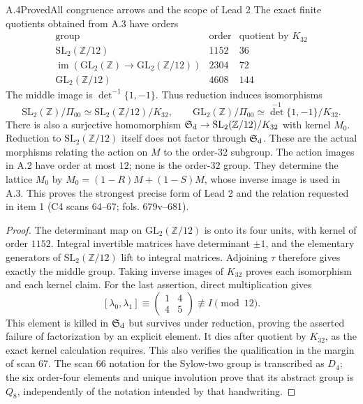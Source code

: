 \begin{statement}{A.4}{Proved}{All congruence arrows and the scope of Lead 2}
The exact finite quotients obtained from A.3 have orders
\[
\begin{array}{c|r|r}
\text{group}&\text{order}&\text{quotient by }K_{32}\\\hline
\mathrm{SL}_2(\mathbb Z/12)&1152&36\\
\operatorname{im}(\mathrm{GL}_2(\mathbb Z)\to\mathrm{GL}_2(\mathbb Z/12))&2304&72\\
\mathrm{GL}_2(\mathbb Z/12)&4608&144
\end{array}
\]
The middle image is $\det^{-1}\{1,-1\}$. Thus reduction induces
isomorphisms
\[
 \mathrm{SL}_2(\mathbb Z)/\Pi_{00}\simeq
 \mathrm{SL}_2(\mathbb Z/12)/K_{32},\qquad
 \mathrm{GL}_2(\mathbb Z)/\Pi_{00}\simeq
 \det^{-1}\{1,-1\}/K_{32}.
\]
There is also a surjective homomorphism
$\mathfrak S_{\rm d}\to\mathrm{SL}_2(\mathbb Z/12)/K_{32}$ with kernel
$M_0$. Reduction to $\mathrm{SL}_2(\mathbb Z/12)$ itself does not
factor through $\mathfrak S_{\rm d}$.
These are the actual morphisms relating the action on $M$ to the
order-$32$ subgroup. The action images in A.2 have order at most $12$;
none is the order-$32$ group. They determine the lattice $M_0$ by
$M_0=(1-R)M+(1-S)M$, whose inverse image is used in A.3.
This proves the strongest precise form of Lead 2 and the relation
requested in item 1 (C4 scans 64--67; fols. 679v--681).
\end{statement}
\begin{proof}
The determinant map on $\mathrm{GL}_2(\mathbb Z/12)$ is onto its four
units, with kernel of order $1152$. Integral invertible matrices have
determinant $\pm1$, and the elementary generators of
$\mathrm{SL}_2(\mathbb Z/12)$ lift to integral matrices. Adjoining
$\tau$ therefore gives exactly the middle group. Taking inverse
images of $K_{32}$ proves each isomorphism and each kernel claim.
For the last assertion, direct multiplication gives
\[
 [\lambda_0,\lambda_1]\equiv
 \begin{pmatrix}1&4\\4&5\end{pmatrix}\not\equiv I\pmod{12}.
\]
This element is killed in $\mathfrak S_{\rm d}$ but survives under
reduction, proving the asserted failure of factorization by an
explicit element. It dies after quotient by $K_{32}$, as the exact
kernel calculation requires. This also verifies the qualification in
the margin of scan 67. The scan 66 notation for the Sylow-two group
is transcribed as $D_4$; the six order-four elements and unique
involution prove that its abstract group is $Q_8$, independently of
the notation intended by that handwriting.
\end{proof}

